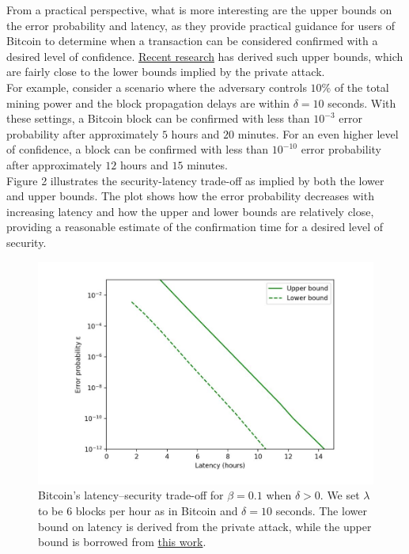 From a practical perspective, what is more interesting are the upper bounds on the error probability and latency, as they provide practical guidance for users of Bitcoin to determine when a transaction can be considered confirmed with a desired level of confidence. \href{https://arxiv.org/pdf/2011.14051.pdf}{Recent research} has derived such upper bounds, which are fairly close to the lower bounds implied by the private attack.\\
For example, consider a scenario where the adversary controls $10\%$ of the total mining power and the block propagation delays are within $\delta = 10$ seconds. With these settings, a Bitcoin block can be confirmed with less than $10^{-3}$ error probability after approximately $5$ hours and $20$ minutes. For an even higher level of confidence, a block can be confirmed with less than $10^{-10}$ error probability after approximately $12$ hours and $15$ minutes.\\
Figure 2 illustrates the security-latency trade-off as implied by both the lower and upper bounds. The plot shows how the error probability decreases with increasing latency and how the upper and lower bounds are relatively close, providing a reasonable estimate of the confirmation time for a desired level of security.
\begin{center}
	\begin{figure}
		\centering
		\includegraphics[width=0.8\linewidth]{Fig/09/F2}
		\caption{Bitcoin’s latency–security trade-oﬀ for $\beta = 0.1$ when $\delta > 0$. We set $\lambda$ to be $6$ blocks per hour as in Bitcoin and $\delta = 10$ seconds. The lower bound on latency is derived from the private attack, while the upper bound is borrowed from \href{https://arxiv.org/pdf/2011.14051.pdf}{this work}.}
		\label{fig:f1}
	\end{figure}
\end{center}
